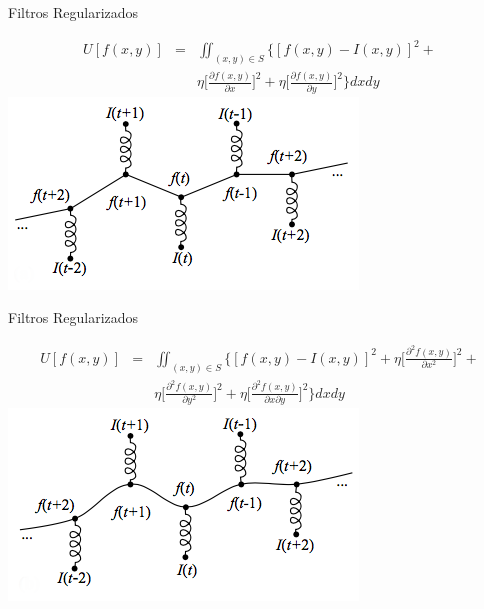 \documentclass[]{beamer}
\begin{document}
\begin{frame}{Filtros Regularizados}
\begin{center}

\begin{eqnarray}
  U[f(x,y)] &=&\iint_{(x,y) \in S} \Bigg\{ [f(x,y)-I(x,y)]^2 +  \nonumber \\
     & & \eta \bigg[  \frac{\partial f(x,y)}{\partial x} \bigg]^2 +
            \eta \bigg[  \frac{\partial f(x,y)}{\partial y} \bigg]^2 
     \Bigg\} dx dy
\end{eqnarray}
\includegraphics[scale=0.6]{Images/RegularizadosResorte.png}

\end{center}
\end{frame}
\begin{frame}{Filtros Regularizados}
\begin{center}

\begin{eqnarray}
  U[f(x,y)] &=&\iint_{(x,y) \in S} \Bigg\{ [f(x,y)-I(x,y)]^2 + 
     \eta \bigg[  \frac{\partial ^2 f(x,y)}{\partial x^2} \bigg]^2 +
                \nonumber \\
      & &\eta \bigg[  \frac{\partial ^2 f(x,y)}{\partial y^2} \bigg]^2 +
     \eta \bigg[  \frac{\partial ^2 f(x,y)}{\partial x \partial y} \bigg]^2
     \Bigg\} dx dy
\end{eqnarray}
\includegraphics[scale=0.6]{Images/RegularizadosPlaca.png}

\end{center}
\end{frame}
\end{document}
